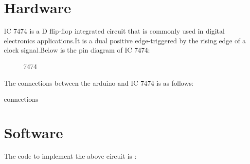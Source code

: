 \documentclass{article}
\begin{document}
\section{Hardware}

  IC 7474 is a D flip-flop integrated circuit that is commonly used in digital electronics applications.It is a dual positive edge-triggered by the rising edge of a clock signal.Below is the pin diagram of IC 7474:
  \begin{figure}[h]
    \centering
    
    \caption{7474}
    \label{fig:2}
  \end{figure}


The connections between the arduino and IC 7474 is as follows:
  \begin{table}[h]
    \begin{center}
      
      \caption{connections}
      \label{table:3}
    \end{center}
  \end{table}


\section{Software}

The code to implement the above circuit is : \\

    
\end{document}
